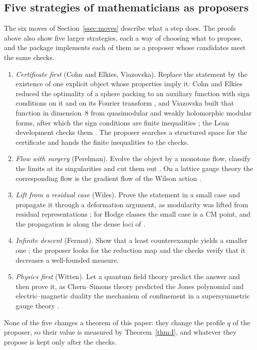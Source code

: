 \subsection{Five strategies of mathematicians as proposers}\label{ssec:strategies}

The six moves of Section~\ref{ssec:moves} describe what a step does. The proofs above also show five larger strategies, each a way of choosing what to propose, and the package implements each of them as a proposer whose candidates meet the same checks.
\begin{enumerate}[label=(\roman*),leftmargin=1.8em,itemsep=1pt]
\item \emph{Certificate first} (Cohn and Elkies, Viazovska). Replace the statement by the existence of one explicit object whose properties imply it: Cohn and Elkies reduced the optimality of a sphere packing to an auxiliary function with sign conditions on it and on its Fourier transform \cite{CE03}, and Viazovska built that function in dimension~$8$ from quasimodular and weakly holomorphic modular forms, after which the sign conditions are finite inequalities \cite{Via17,CKM17}; the Lean development checks them \cite{HBL26,ArcSP}. The proposer searches a structured space for the certificate and hands the finite inequalities to the checks.
\item \emph{Flow with surgery} (Perelman). Evolve the object by a monotone flow, classify the limits at its singularities and cut them out \cite{Per02,Per03a,Per03b}. On a lattice gauge theory the corresponding flow is the gradient flow of the Wilson action \cite{Lus10}.
\item \emph{Lift from a residual case} (Wiles). Prove the statement in a small case and propagate it through a deformation argument, as modularity was lifted from residual representations \cite{Wil95,TW95}; for Hodge classes the small case is a CM point, and the propagation is along the dense loci of \cite{BB26c}.
\item \emph{Infinite descent} (Fermat). Show that a least counterexample yields a smaller one \cite{Wei84}; the proposer looks for the reduction map and the checks verify that it decreases a well-founded measure.
\item \emph{Physics first} (Witten). Let a quantum field theory predict the answer and then prove it, as Chern--Simons theory predicted the Jones polynomial \cite{Wit89} and electric--magnetic duality the mechanism of confinement in a supersymmetric gauge theory \cite{SW94}.
\end{enumerate}
None of the five changes a theorem of this paper: they change the profile $q$ of the proposer, so their value is measured by Theorem~\ref{thm:I}, and whatever they propose is kept only after the checks.
